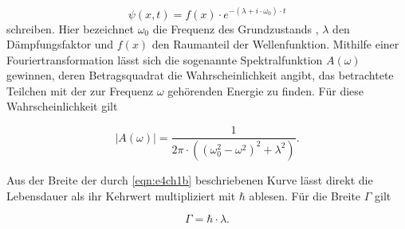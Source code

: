 \begin{equation}
  \label{eqn:e3ch1b}
  \psi(x,t) = f(x) \cdot e^{-\left( \lambda + i \cdot \omega_{0} \right) \cdot t}
\end{equation}
schreiben. Hier bezeichnet $\omega_{0}$ die Frequenz des Grundzustands , $\lambda$ den Dämpfungsfaktor und
$f(x)$ den Raumanteil der Wellenfunktion. Mithilfe einer Fouriertransformation lässt sich die sogenannte
Spektralfunktion $A(\omega)$ gewinnen, deren Betragsquadrat die Wahrscheinlichkeit angibt, das betrachtete Teilchen
mit der zur Frequenz $\omega$ gehörenden Energie zu finden.
Für diese Wahrscheinlichkeit gilt

\begin{equation}
  \label{eqn:e4ch1b}
  |A(\omega)| = \frac{1}{2\pi \cdot \left( \left( \omega_{0}^2 - \omega^2 \right)^2 + \lambda^2 \right)}.
\end{equation}

Aus der Breite der durch \eqref{eqn:e4ch1b} beschriebenen Kurve lässt direkt die Lebensdauer als ihr Kehrwert multipliziert mit $\hbar$ ablesen.
Für die Breite $\Gamma$ gilt

\begin{equation}
  \label{eqn:e5ch1b}
  \Gamma = \hbar \cdot \lambda.
\end{equation}

